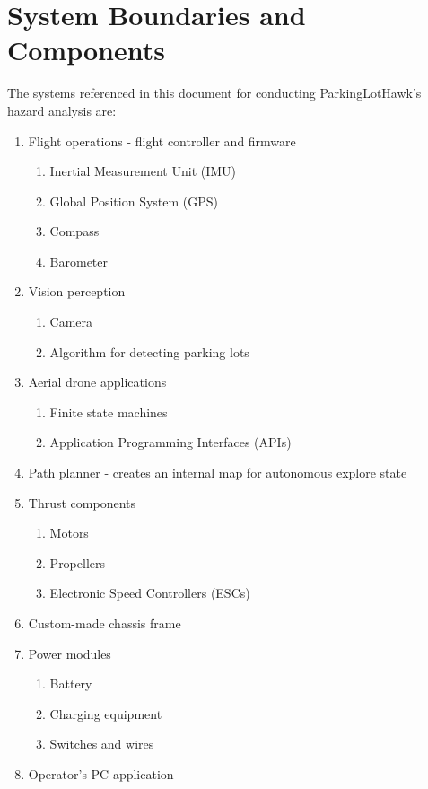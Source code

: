 \documentclass{article}
\begin{document}
\section{System Boundaries and Components}
The systems referenced in this document for conducting ParkingLotHawk’s hazard analysis are:

\begin{enumerate}
\item Flight operations - flight controller and firmware
\begin{enumerate}
    \item Inertial Measurement Unit (IMU)
    \item Global Position System (GPS)
    \item Compass
    \item Barometer
\end{enumerate}

\item Vision perception
\begin{enumerate}
    \item Camera
    \item Algorithm for detecting parking lots
\end{enumerate}

\item Aerial drone applications
\begin{enumerate}
    \item Finite state machines
    \item Application Programming Interfaces (APIs)
\end{enumerate}

\item Path planner - creates an internal map for autonomous explore state
\item Thrust components
\begin{enumerate}
    \item Motors
    \item Propellers
    \item Electronic Speed Controllers (ESCs)
\end{enumerate}

\item Custom-made chassis frame
\item Power modules
\begin{enumerate}
    \item Battery
    \item Charging equipment
    \item Switches and wires
\end{enumerate}

\item Operator's PC application

\end{enumerate}
\end{document}
